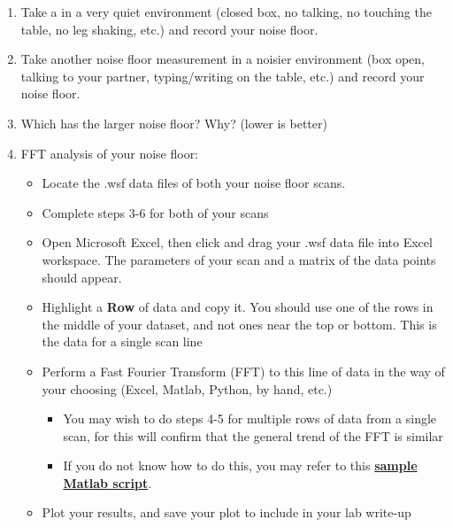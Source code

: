 \documentclass{../lab}
\begin{document}
\begin{enumerate}
    \item Take a \textbf{} in a very quiet environment (closed box, no talking, no touching the table, no leg shaking, etc.) and record your noise floor.

    \item Take another noise floor measurement in a noisier environment (box open, talking to your partner, typing/writing on the table, etc.) and record your noise floor.

    \item Which has the larger noise floor? Why? (lower is better)

    \item FFT analysis of your noise floor:

    \begin{itemize}
        \item Locate the .wsf data files of both your noise floor scans.

        \item Complete steps 3-6 for both of your scans

        \item Open Microsoft Excel, then click and drag your .wsf data file into Excel workspace.  The parameters of your scan and a matrix of the data points should appear.

        \item Highlight a \textbf{Row} of data and copy it.  You should use one of the rows in the middle of your dataset, and not ones near the top or bottom.  This is the data for a single scan line

        \item Perform a Fast Fourier Transform (FFT) to this line of data in the way of your choosing (Excel, Matlab, Python, by hand, etc.)

    \begin{itemize}
        \item You may wish to do steps 4-5 for multiple rows of data from a single scan, for this will confirm that the general trend of the FFT is similar

        \item If you do not know how to do this, you may refer to this \href{http://experimentationlab.berkeley.edu/sites/default/files/AFMImages/afm\_freq.m}{\textbf{sample Matlab script}}.

    \end{itemize}

        \item Plot your results, and save your plot to include in your lab write-up


\end{itemize}
\end{enumerate}
\end{document}
